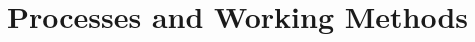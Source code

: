 \begin{comment}
    - Processes and working method (Olle)
    -The plan is to create an visual chart representing the main process in the company, in the form of the flow from requirments to a delivered product/function. This will begin the process chapter and will also includa a descriptive text written me (Olle) and the analysts. (OLLE DOES THIS)

    -After presenting the overal process, the main working methods (wich contains processes) will be reffered to according to below:
        - Testing : Test plan (
        - Error handling: Described in the Test plan (
        - Handling of risks: Risk managment plan (https://www.overleaf.com/project/66e6db3848ba4493cf2e8b34)
        - Git: Described in Git (https://gitlab.liu.se/tddc88-ht24/company3/-/blob/development/README.md?ref_type=heads)
        - Change management: Is described in Quality Assurance Plan, section "Change Management"
        - Version Control (Is developed by Adrian)
        - Plan for competence and education: Is found in this document (Project Management Plan)

LINKS
 https://liuonline.sharepoint.com/:u:/r/sites/TDDC88_2024_C3/Delade%
 
 https://liuonline.sharepoint.com/:u:/r/sites/TDDC88_2024_C3/Delade%
 
 https://liuonline.sharepoint.com/:u:/r/sites/TDDC88_2024_C3/Delade%
 
 https://liuonline.sharepoint.com/:u:/r/sites/TDDC88_2024_C3/Delade%
 
 https://liuonline.sharepoint.com/:u:/r/sites/TDDC88_2024_C3/Delade%
 
 https://liuonline.sharepoint.com/:u:/r/sites/TDDC88_2024_C3/Delade%


\end{comment}




\section{Processes and Working Methods}

